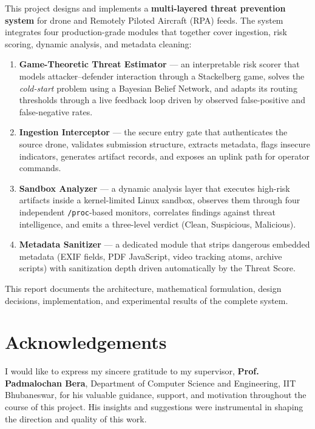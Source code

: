 \documentclass[12pt, a4paper]{report}
\begin{document}
This project designs and implements a \textbf{multi-layered threat prevention
system} for drone and Remotely Piloted Aircraft (RPA) feeds. The system
integrates four production-grade modules that together cover ingestion, risk
scoring, dynamic analysis, and metadata cleaning:

\begin{enumerate}
    \item \textbf{Game-Theoretic Threat Estimator} — an interpretable risk
          scorer that models attacker--defender interaction through a
          Stackelberg game, solves the \emph{cold-start} problem using a
          Bayesian Belief Network, and adapts its routing thresholds through a
          live feedback loop driven by observed false-positive and
          false-negative rates.
    \item \textbf{Ingestion Interceptor} — the secure entry gate that
          authenticates the source drone, validates submission structure,
          extracts metadata, flags insecure indicators, generates artifact
          records, and exposes an uplink path for operator commands.
    \item \textbf{Sandbox Analyzer} — a dynamic analysis layer that executes
          high-risk artifacts inside a kernel-limited Linux sandbox, observes
          them through four independent \texttt{/proc}-based monitors,
          correlates findings against threat intelligence, and emits a
          three-level verdict (Clean, Suspicious, Malicious).
    \item \textbf{Metadata Sanitizer} — a dedicated module that strips
          dangerous embedded metadata (EXIF fields, PDF JavaScript, video
          tracking atoms, archive scripts) with sanitization depth driven
          automatically by the Threat Score.
\end{enumerate}

This report documents the architecture, mathematical formulation, design
decisions, implementation, and experimental results of the complete system.

\vfill

\chapter*{Acknowledgements}
\thispagestyle{plain}

I would like to express my sincere gratitude to my supervisor,
\textbf{Prof. Padmalochan Bera}, Department of Computer Science and Engineering,
IIT Bhubaneswar, for his valuable guidance, support, and motivation throughout
the course of this project. His insights and suggestions were instrumental in
shaping the direction and quality of this work.
\end{document}
